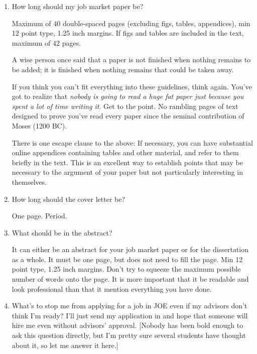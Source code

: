 \documentclass{econtex}
\begin{document}
\begin{enumerate}
\item How long should my job market paper be?
  
  Maximum of 40 double-spaced pages (excluding figs, tables,
  appendices), min 12 point type, 1.25 inch margins.  If figs and
  tables are included in the text, maximum of 42 pages.   
  
  A wise person once said that a paper is not finished when nothing
  remains to be added; it is finished when nothing remains that could
  be taken away.
  
  If you think you can't fit everything into these guidelines, think
  again.  You've got to realize that {\it nobody is going to read a
    huge fat paper just because you spent a lot of time writing it}.
  Get to the point.  No rambling pages of text designed to prove you've
  read every paper since the seminal contribution of Moses (1200 BC).
  
  There is one escape clause to the above: If necessary, you can have
  substantial online appendices containing tables and other material, and
  refer to them briefly in the text.  This is an excellent way to
  establish points that may be necessary to the argument of your paper
  but not particularly interesting in themselves.   

\item How long should the cover letter be?

  One page.  Period.

\item What should be in the abstract?

  It can either be an abstract for your job market paper or for the dissertation 
as a whole.  It must be one page, but does not need to fill the page.  Min 12 point
type, 1.25 inch margins.  Don't try to squeeze the maximum possible number of words onto
the page.  It is more important that it be readable and look professional than that 
it mention everything you have done.

\item What's to stop me from applying for a job in JOE even if my advisors don't think I'm ready?  I'll just send 
my application in and hope that someone will hire me even without advisors' approval.  [Nobody 
has been bold enough to ask this question directly, but I'm pretty sure several students have thought about it,
so let me answer it here.]


\end{enumerate}
\end{document}

